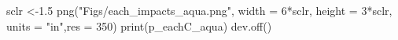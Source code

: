 \documentclass[
]{article}
\newenvironment{Shaded}{\begin{snugshade}}{\end{snugshade}}
\newcommand{\AttributeTok}[1]{\textcolor[rgb]{0.77,0.63,0.00}{#1}}
\newcommand{\DecValTok}[1]{\textcolor[rgb]{0.00,0.00,0.81}{#1}}
\newcommand{\FloatTok}[1]{\textcolor[rgb]{0.00,0.00,0.81}{#1}}
\newcommand{\FunctionTok}[1]{\textcolor[rgb]{0.00,0.00,0.00}{#1}}
\newcommand{\NormalTok}[1]{#1}
\newcommand{\OtherTok}[1]{\textcolor[rgb]{0.56,0.35,0.01}{#1}}
\newcommand{\SpecialCharTok}[1]{\textcolor[rgb]{0.00,0.00,0.00}{#1}}
\newcommand{\StringTok}[1]{\textcolor[rgb]{0.31,0.60,0.02}{#1}}
\begin{document}
\begin{Shaded}
\begin{Highlighting}[]
\NormalTok{    sclr }\OtherTok{\textless{}{-}}\FloatTok{1.5}
\FunctionTok{png}\NormalTok{(}\StringTok{"Figs/each\_impacts\_aqua.png"}\NormalTok{, }
    \AttributeTok{width =} \DecValTok{6}\SpecialCharTok{*}\NormalTok{sclr, }\AttributeTok{height =} \DecValTok{3}\SpecialCharTok{*}\NormalTok{sclr, }\AttributeTok{units =} \StringTok{"in"}\NormalTok{,}\AttributeTok{res =} \DecValTok{350}\NormalTok{)}
\FunctionTok{print}\NormalTok{(p\_eachC\_aqua)}
\FunctionTok{dev.off}\NormalTok{()}
\end{Highlighting}
\end{Shaded}
\end{document}
